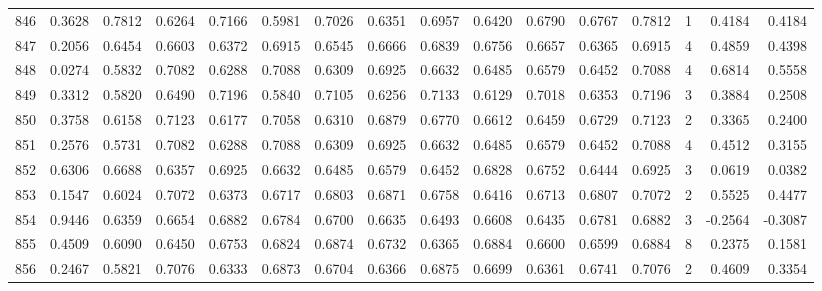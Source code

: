 \begin{tabular}{lrrrrrrrrrrrrrrr}
846 &      0.3628 &  0.7812 &  0.6264 &  0.7166 &  0.5981 &  0.7026 &  0.6351 &  0.6957 &  0.6420 &  0.6790 &   0.6767 &     0.7812 &      1 &                    0.4184 &                     0.4184 \\
847 &      0.2056 &  0.6454 &  0.6603 &  0.6372 &  0.6915 &  0.6545 &  0.6666 &  0.6839 &  0.6756 &  0.6657 &   0.6365 &     0.6915 &      4 &                    0.4859 &                     0.4398 \\
848 &      0.0274 &  0.5832 &  0.7082 &  0.6288 &  0.7088 &  0.6309 &  0.6925 &  0.6632 &  0.6485 &  0.6579 &   0.6452 &     0.7088 &      4 &                    0.6814 &                     0.5558 \\
849 &      0.3312 &  0.5820 &  0.6490 &  0.7196 &  0.5840 &  0.7105 &  0.6256 &  0.7133 &  0.6129 &  0.7018 &   0.6353 &     0.7196 &      3 &                    0.3884 &                     0.2508 \\
850 &      0.3758 &  0.6158 &  0.7123 &  0.6177 &  0.7058 &  0.6310 &  0.6879 &  0.6770 &  0.6612 &  0.6459 &   0.6729 &     0.7123 &      2 &                    0.3365 &                     0.2400 \\
851 &      0.2576 &  0.5731 &  0.7082 &  0.6288 &  0.7088 &  0.6309 &  0.6925 &  0.6632 &  0.6485 &  0.6579 &   0.6452 &     0.7088 &      4 &                    0.4512 &                     0.3155 \\
852 &      0.6306 &  0.6688 &  0.6357 &  0.6925 &  0.6632 &  0.6485 &  0.6579 &  0.6452 &  0.6828 &  0.6752 &   0.6444 &     0.6925 &      3 &                    0.0619 &                     0.0382 \\
853 &      0.1547 &  0.6024 &  0.7072 &  0.6373 &  0.6717 &  0.6803 &  0.6871 &  0.6758 &  0.6416 &  0.6713 &   0.6807 &     0.7072 &      2 &                    0.5525 &                     0.4477 \\
854 &      0.9446 &  0.6359 &  0.6654 &  0.6882 &  0.6784 &  0.6700 &  0.6635 &  0.6493 &  0.6608 &  0.6435 &   0.6781 &     0.6882 &      3 &                   -0.2564 &                    -0.3087 \\
855 &      0.4509 &  0.6090 &  0.6450 &  0.6753 &  0.6824 &  0.6874 &  0.6732 &  0.6365 &  0.6884 &  0.6600 &   0.6599 &     0.6884 &      8 &                    0.2375 &                     0.1581 \\
856 &      0.2467 &  0.5821 &  0.7076 &  0.6333 &  0.6873 &  0.6704 &  0.6366 &  0.6875 &  0.6699 &  0.6361 &   0.6741 &     0.7076 &      2 &                    0.4609 &                     0.3354 \\

\end{tabular}

